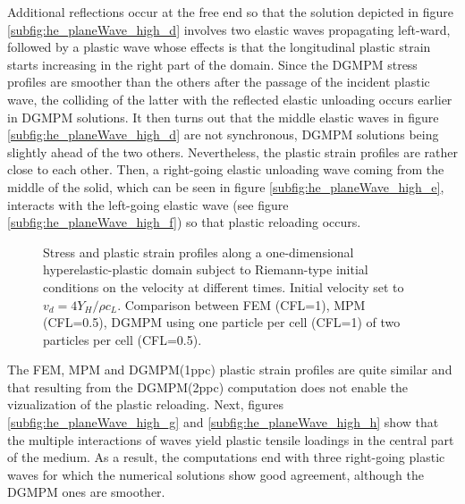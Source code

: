 Additional reflections occur at the free end so that the solution depicted in figure \ref{subfig:he_planeWave_high_d} involves two elastic waves propagating left-ward, followed by a plastic wave whose effects is that the longitudinal plastic strain starts increasing in the right part of the domain.
Since the DGMPM stress profiles are smoother than the others after the passage of the incident plastic wave, the colliding of the latter with the reflected elastic unloading occurs earlier in DGMPM solutions.
It then turns out that the middle elastic waves in figure \ref{subfig:he_planeWave_high_d} are not synchronous, DGMPM solutions being slightly ahead of the two others.
Nevertheless, the plastic strain profiles are rather close to each other.
Then, a right-going elastic unloading wave coming from the middle of the solid, which can be seen in figure \ref{subfig:he_planeWave_high_e}, interacts with the left-going elastic wave (see figure \ref{subfig:he_planeWave_high_f}) so that plastic reloading occurs.
\begin{figure}[ht]
  \centering
  {}
  {}
  {}
  {}
  {}
  {}
  {}
  {}
  {}
  
  
  
  \caption{Stress and plastic strain profiles along a one-dimensional hyperelastic-plastic domain subject to Riemann-type initial conditions on the velocity at different times. Initial velocity set to $v_d=4Y_H/\rho c_L$.
  Comparison between FEM (CFL=1), MPM (CFL=0.5), DGMPM using one particle per cell (CFL=1) of two particles per cell (CFL=0.5).
  }
  \label{fig:hep_planeWave_high}
\end{figure}
The FEM, MPM and DGMPM(1ppc) plastic strain profiles are quite similar and that resulting from the DGMPM(2ppc) computation does not enable the vizualization of the plastic reloading.
Next, figures \ref{subfig:he_planeWave_high_g} and \ref{subfig:he_planeWave_high_h} show that the multiple interactions of waves yield plastic tensile loadings in the central part of the medium.
As a result, the computations end with three right-going plastic waves for which the numerical solutions show good agreement, although the DGMPM ones are smoother.

